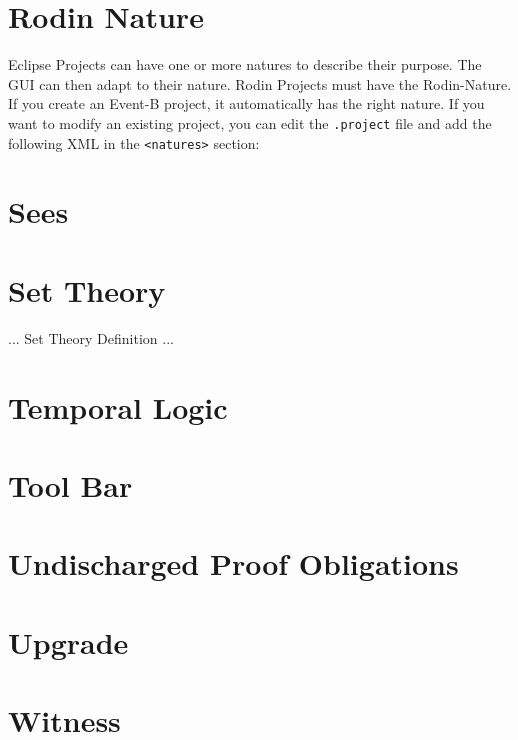 \section{Rodin Nature}
\label{rodin_nature}

Eclipse Projects can have one or more natures to describe their purpose.  The GUI can then adapt to their nature.  Rodin Projects must have the Rodin-Nature.  If you create an Event-B project, it automatically has the right nature.  If you want to modify an existing project, you can edit the \texttt{.project} file and add the following XML in the \texttt{<natures>} section:


\section{Sees}
\label{sees}

\section{Set Theory}
\label{set_theory}

... Set Theory Definition ...

\section{Temporal Logic}
\label{temporal_logic}

\section{Tool Bar}
\label{tool_bar}

\section{Undischarged Proof Obligations}
\label{undischarged_proof_obligations}

\section{Upgrade}
\label{Upgrade}


\section{Witness}
\label{witness}



